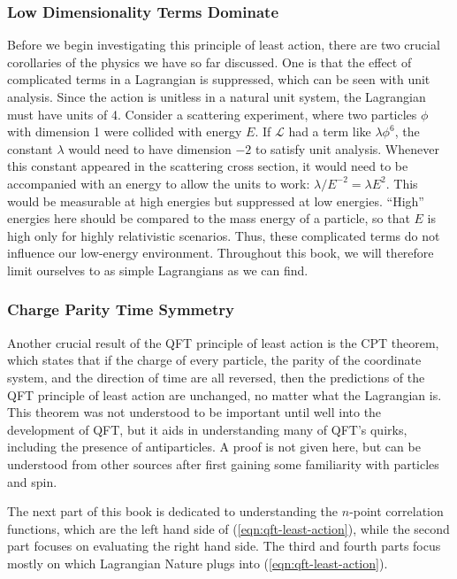 \subsubsection*{Low Dimensionality Terms Dominate}
Before we begin investigating this principle of least action, there are two crucial corollaries of the physics we have so far discussed. One is that the effect of complicated terms in a Lagrangian is suppressed, which can be seen with unit analysis. Since the action is unitless in a natural unit system, the Lagrangian must have units of 4. Consider a scattering experiment, where two particles $\phi$ with dimension 1 were collided with energy $E$. If $\mathcal{L}$ had a term like $\lambda \phi^6$, the constant $\lambda$ would need to have dimension $-2$ to satisfy unit analysis. Whenever this constant appeared in the scattering cross section, it would need to be accompanied with an energy to allow the units to work: $\lambda / E^{-2} = \lambda E^2$. This would be measurable at high energies but suppressed at low energies. ``High'' energies here should be compared to the mass energy of a particle, so that $E$ is high only for highly relativistic scenarios. Thus, these complicated terms do not influence our low-energy environment. Throughout this book, we will therefore limit ourselves to as simple Lagrangians as we can find.

\subsubsection*{Charge Parity Time Symmetry}
Another crucial result of the QFT principle of least action is the CPT theorem, which states that if the charge of every particle, the parity of the coordinate system, and the direction of time are all reversed, then the predictions of the QFT principle of least action are unchanged, no matter what the Lagrangian is. This theorem was not understood to be important until well into the development of QFT, but it aids in understanding many of QFT's quirks, including the presence of antiparticles. A proof is not given here, but can be understood from other sources after first gaining some familiarity with particles and spin.

The next part of this book is dedicated to understanding the $n$-point correlation functions, which are the left hand side of (\ref{eqn:qft-least-action}), while the second part focuses on evaluating the right hand side. The third and fourth parts focus mostly on which Lagrangian Nature plugs into (\ref{eqn:qft-least-action}).